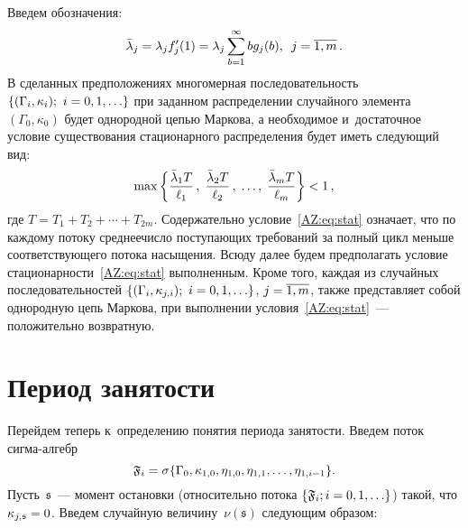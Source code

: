 \begin{multicols}{2}
Введем обозначения:
$$
\bar \lambda_j =  \lambda_j f'_j(1)=\lambda_j \sum_{b=1}^\infty b g_j(b), \enskip
j=\overline{1,m}\,.
$$
В сделанных предположениях многомерная последовательность
$\{(\Gamma_i, \kappa_i);\ i\hm=0, 1, \ldots\}$ при заданном распределении случайного
элемента $(\Gamma_0, \kappa_0)$ будет однородной цепью Маркова, а необходимое и~достаточное условие существования стационарного распределения будет иметь
следующий вид:
\begin{equation}
  \max\left\{ \displaystyle\frac{\displaystyle {\bar\lambda_1}T\mathstrut}{\displaystyle \ell_1\mathstrut}\,,\;
  \frac{{\bar\lambda_2}T}{\ell_2}\,,\; \ldots,\;
  \frac{{\bar\lambda_m}T}{\ell_m}\right\}<1\,,
  \label{AZ:eq:stat}
\end{equation}
где $ T=T_1+T_2+\cdots+T_{2m}$. Содержательно условие~\eqref{AZ:eq:stat}
означает, что по каждому потоку среднее\linebreak чис\-ло поступающих требований за полный
цикл меньше соответствующего потока насыщения. Всюду далее будем предполагать
условие стационарности~\eqref{AZ:eq:stat} выполненным. Кроме того, каждая из
случайных последовательностей $\{(\Gamma_i, \kappa_{j,i});\ i\hm= 0,1, \ldots\}$, $j\hm=\overline{1,  m}$, 
также представляет собой однородную цепь Маркова, при выполнении
условия~\eqref{AZ:eq:stat}~--- положительно возвратную.

\vspace*{-6pt}

\section{Период занятости}

\vspace*{-3pt}

Перейдем теперь к~определению понятия периода занятости. Введем поток
сиг\-ма-алгебр
$$
\mathfrak{F}_{i}\hm= \sigma\{\Gamma_{0}, \kappa_{1,0}, \eta_{1,0}, \eta_{1,1},
\ldots, \eta_{1,i-1}\}.
$$
 Пусть~$\mathfrak s$~--- момент остановки (относительно
потока $\{\mathfrak F_i; i\hm=0, 1, \ldots\}$) такой, что
$\kappa_{j,\mathfrak s}\hm=0$. Введем случайную величину~$\nu(\mathfrak s)$
следующим образом:

\vspace*{-6pt}


\end{multicols}

